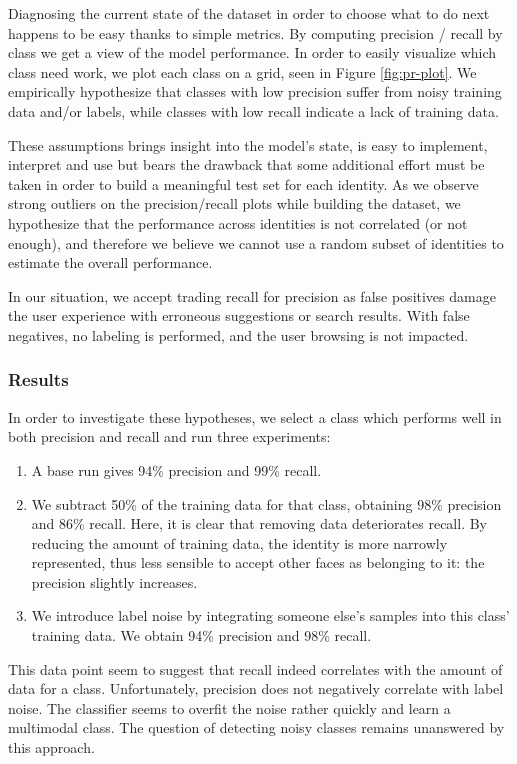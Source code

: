 Diagnosing the current state of the dataset in order to choose what to do next happens to be easy thanks to simple metrics. By computing precision / recall by class we get a view of the model performance. In order to easily visualize which class need work, we plot each class on a grid, seen in Figure \ref{fig:pr-plot}. We empirically hypothesize that classes with low precision suffer from noisy training data and/or labels, while classes with low recall indicate a lack of training data.

These assumptions brings insight into the model's state, is easy to implement, interpret and use but bears the drawback that some additional effort must be taken in order to build a meaningful test set for each identity. As we observe strong outliers on the precision/recall plots while building the dataset, we hypothesize that the performance across identities is not correlated (or not enough), and therefore we believe we cannot use a random subset of identities to estimate the overall performance.

In our situation, we accept trading recall for precision as false positives damage the user experience with erroneous suggestions or search results. With false negatives, no labeling is performed, and the user browsing is not impacted.

\subsubsection{Results}

In order to investigate these hypotheses, we select a class which performs well in both precision and recall and run three experiments:

\begin{enumerate}
    \item A base run gives 94\% precision and 99\% recall.
    \item We subtract 50\% of the training data for that class, obtaining 98\% precision and 86\% recall. Here, it is clear that removing data deteriorates recall. By reducing the amount of training data, the identity is more narrowly represented, thus less sensible to accept other faces as belonging to it: the precision slightly increases.
    \item We introduce label noise by integrating someone else's samples into this class' training data. We obtain 94\% precision and 98\% recall.
\end{enumerate}

This data point seem to suggest that recall indeed correlates with the amount of data for a class. Unfortunately, precision does not negatively correlate with label noise. The classifier seems to overfit the noise rather quickly and learn a multimodal class. The question of detecting noisy classes remains unanswered by this approach.

